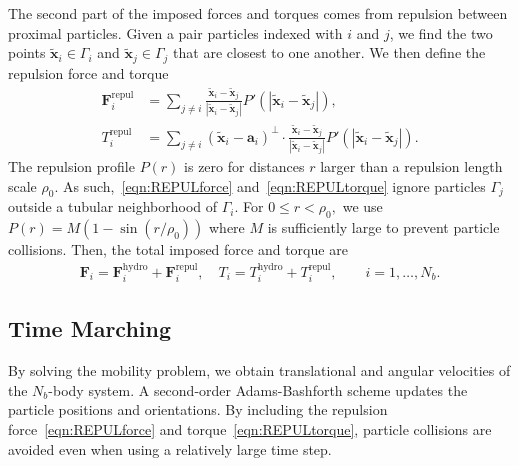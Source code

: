 \documentclass[lineno]{jfm}
\renewcommand{\aa}{\mathbf{a}}
\newcommand{\FF}{\mathbf{F}}
\newcommand{\xx}{\mathbf{x}}
\newcommand{\yy}{\mathbf{y}}
\begin{document}
The second part of the imposed forces and torques comes from repulsion
between proximal particles. Given a pair particles indexed with $i$ and
$j$, we find the two points $\tilde{\xx}_i \in \Gamma_i$ and
$\tilde{\xx}_j \in \Gamma_j$ that are closest to one another. We then
define the repulsion force and torque
\begin{align}
%
  \label{eqn:REPULforce}
  \FF_i^{\text{repul}} &= \sum_{j \neq i} 
    \frac{\tilde{\xx}_i - \tilde{\xx}_j}
    {|\tilde{\xx}_i - \tilde{\xx}_j|} 
    P'(|\tilde{\xx}_i - \tilde{\xx}_j|), \\
  \label{eqn:REPULtorque}
  T_i^{\text{repul}} &= \sum_{j \neq i} 
    (\tilde{\xx}_i - \aa_i)^{\perp} \cdot 
    \frac{\tilde{\xx}_i - \tilde{\xx}_j}
    {|\tilde{\xx}_i - \tilde{\xx}_j|} 
    P'(|\tilde{\xx}_i - \tilde{\xx}_j|).
\end{align}
The repulsion profile $P(r)$ is zero for distances $r$ larger than a
repulsion length scale $\rho_0$. As such,~\eqref{eqn:REPULforce}
and~\eqref{eqn:REPULtorque} ignore particles $\Gamma_j$ outside a
tubular neighborhood of $\Gamma_i$. For $0 \leq r < \rho_0,$ we use
$P(r) = M(1 - \sin(r/\rho_0))$ where $M$ is sufficiently large to
prevent particle collisions. Then, the total imposed force and torque
are
\begin{align}
  \FF_i = \FF_i^{\text{hydro}} + \FF_i^{\text{repul}},\quad
  T_i = T_i^{\text{hydro}} + T_i^{\text{repul}}, \qquad
  i=1,\ldots,N_b.
\end{align}


\subsection{Time Marching}
By solving the mobility problem, we obtain translational and angular
velocities of the $N_b$-body system. A second-order Adams-Bashforth
scheme updates the particle positions and orientations. By including the
repulsion force~\eqref{eqn:REPULforce} and
torque~\eqref{eqn:REPULtorque}, particle collisions are avoided even
when using a relatively large time step. 



\end{document}
